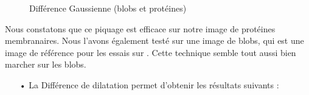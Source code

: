 \begin{figure}[!ht]
\begin{center}
\begin{minipage}{.450\linewidth}
 \end{minipage} \hfill
\caption{Différence Gaussienne (blobs et protéines)}
\end{center}
\end{figure}

Nous constatons que ce piquage est efficace sur notre image de protéines membranaires. Nous l'avons également testé sur une image de blobs, qui est une image de référence pour les essais sur \imj. Cette technique semble tout aussi bien marcher sur les blobs. \\

\begin{itemize}
\item[•] La Différence de dilatation permet d'obtenir les résultats suivants :
\end{itemize}

